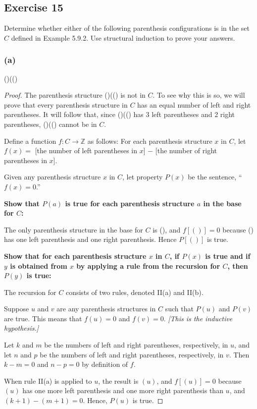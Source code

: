 \documentclass[14pt]{extarticle}
\newcommand{\Z}{\mathbb{Z}}
\begin{document}
\subsection{Exercise 15}
Determine whether either of the following parenthesis configurations is in the set $C$ defined in Example 5.9.2.
Use structural induction to prove your answers.

\subsubsection{(a)}
()(()

\begin{proof}
    The parenthesis structure ()(() is not in $C$. To see why this is so, we will prove that every parenthesis structure
    in $C$ has an equal number of left and right parentheses. It will follow that, since ()(() has 3 left parentheses and
    2 right parentheses, ()(() cannot be in $C$.

    Define a function \(f: C \to \Z\) as follows: For each parenthesis structure $x$ in $C$, let \(f(x) = \)
    [the number of left parentheses in $x$] $-$ [the number of right parentheses in $x$].

    Given any parenthesis structure $x$ in $C$, let property $P(x)$ be the sentence, “$f(x) = 0$.”

    {\bf Show that $P(a)$ is true for each parenthesis structure $a$ in the base for $C$:}

    The only parenthesis structure in the base for $C$ is (), and $f[()] = 0$ because () has one left parenthesis and one right parenthesis. Hence $P[( )]$ is true.

        {\bf Show that for each parenthesis structure $x$ in $C$, if $P(x)$ is true and if $y$ is obtained from $x$ by
            applying a rule from the recursion for $C$, then $P(y)$ is true:}

    The recursion for $C$ consists of two rules, denoted II(a) and II(b).

    Suppose $u$ and $v$ are any parenthesis structures in $C$ such that $P(u)$ and $P(v)$ are true. This means that
    $f(u) = 0$ and $f(v) = 0$. {\it [This is the inductive hypothesis.]}

    Let $k$ and $m$ be the numbers of left and right parentheses, respectively, in $u$, and let $n$ and $p$ be
    the numbers of left and right parentheses, respectively, in $v$. Then \(k - m = 0\) and \(n - p = 0\) by definition of $f$.

    When rule II(a) is applied to $u$, the result is $(u)$, and \(f[(u)] = 0\) because $(u)$ has one more left parenthesis
    and one more right parenthesis than $u$, and \((k + 1) - (m + 1) = 0\). Hence, $P(u)$ is true.


\end{proof}
\end{document}
